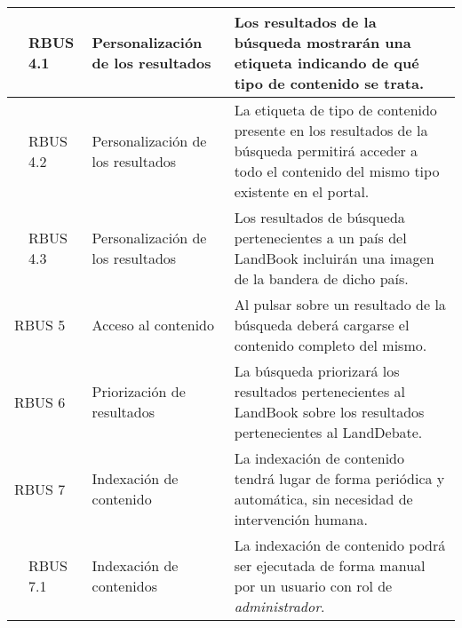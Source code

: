 \begin{longtable}[c]{|p{1mm}|p{14mm}|p{30mm}|p{90mm}|}
\hline
& RBUS 4.1 & Personalización de los resultados & Los resultados de la búsqueda mostrarán una etiqueta indicando de qué tipo de contenido se trata. \\
\hline
& RBUS 4.2 & Personalización de los resultados & La etiqueta de tipo de contenido presente en los resultados de la búsqueda permitirá acceder a todo el contenido del mismo tipo existente en el portal. \\
\hline
& RBUS 4.3 & Personalización de los resultados & Los resultados de búsqueda pertenecientes a un país del LandBook incluirán una imagen de la bandera de dicho país. \\
\hline
\multicolumn{2}{|l|}{RBUS 5}  & Acceso al contenido & Al pulsar sobre un resultado de la búsqueda deberá cargarse el contenido completo del mismo. \\
\hline
\multicolumn{2}{|l|}{RBUS 6}  & Priorización de resultados & La búsqueda priorizará los resultados pertenecientes al LandBook sobre los resultados pertenecientes al LandDebate. \\
\hline
\multicolumn{2}{|l|}{RBUS 7}  & Indexación de contenido & La indexación de contenido tendrá lugar de forma periódica y automática, sin necesidad de intervención humana. \\
\hline
& RBUS 7.1 & Indexación de contenidos & La indexación de contenido podrá ser ejecutada de forma manual por un usuario con rol de \textit{administrador}. \\
\hline
\hline

 \end{longtable}
 
 
 
 
 
 
 
 
 
 
 
 
 
 
 
 
 
 
 
 
 